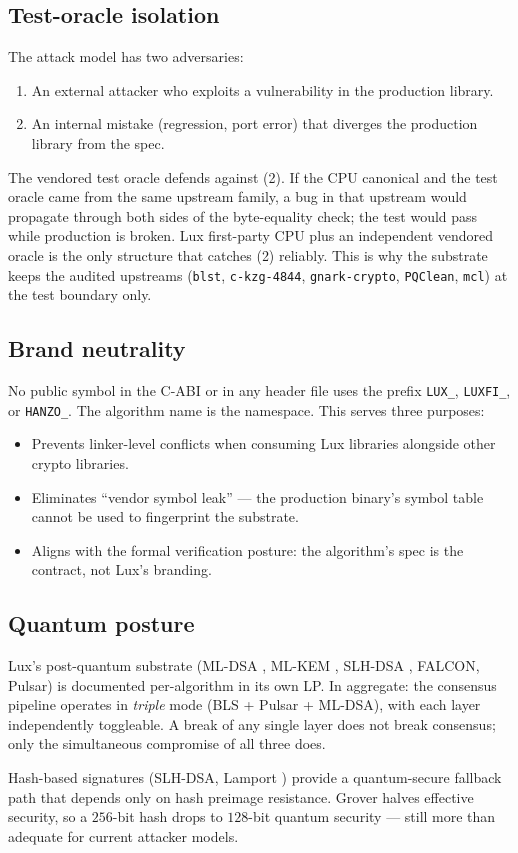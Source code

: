 \subsection{Test-oracle isolation}

The attack model has two adversaries:

\begin{enumerate}
\item An external attacker who exploits a vulnerability in the production library.
\item An internal mistake (regression, port error) that diverges the production library from the spec.
\end{enumerate}

The vendored test oracle defends against (2). If the CPU canonical and the test oracle came from the same upstream family, a bug in that upstream would propagate through both sides of the byte-equality check; the test would pass while production is broken. Lux first-party CPU plus an independent vendored oracle is the only structure that catches (2) reliably. This is why the substrate keeps the audited upstreams (\texttt{blst}, \texttt{c-kzg-4844}, \texttt{gnark-crypto}, \texttt{PQClean}, \texttt{mcl}) at the test boundary only.

\subsection{Brand neutrality}

No public symbol in the C-ABI or in any header file uses the prefix \texttt{LUX\_}, \texttt{LUXFI\_}, or \texttt{HANZO\_}. The algorithm name is the namespace. This serves three purposes:

\begin{itemize}
\item Prevents linker-level conflicts when consuming Lux libraries alongside other crypto libraries.
\item Eliminates ``vendor symbol leak'' --- the production binary's symbol table cannot be used to fingerprint the substrate.
\item Aligns with the formal verification posture: the algorithm's spec is the contract, not Lux's branding.
\end{itemize}

\subsection{Quantum posture}

Lux's post-quantum substrate (ML-DSA \cite{fips204}, ML-KEM \cite{fips203}, SLH-DSA \cite{fips205}, FALCON, Pulsar) is documented per-algorithm in its own LP. In aggregate: the consensus pipeline operates in \emph{triple} mode (BLS + Pulsar + ML-DSA), with each layer independently toggleable. A break of any single layer does not break consensus; only the simultaneous compromise of all three does.

Hash-based signatures (SLH-DSA, Lamport \cite{lamport79}) provide a quantum-secure fallback path that depends only on hash preimage resistance. Grover halves effective security, so a $256$-bit hash drops to $128$-bit quantum security --- still more than adequate for current attacker models.
